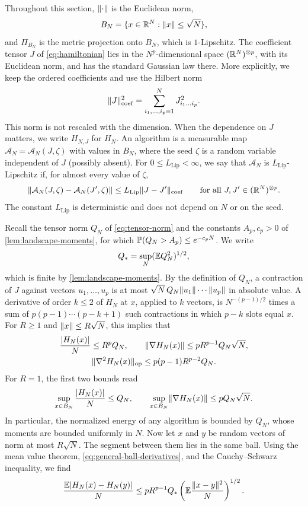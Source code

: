 Throughout this section, $\lVert\cdot\rVert$ is the Euclidean norm,
\[
 B_N=\{x\in\mathbb R^N:\lVert x\rVert\le\sqrt N\},
\]
and $\Pi_{B_N}$ is the metric projection onto $B_N$, which is $1$-Lipschitz.
The coefficient tensor $J$ of \eqref{eq:hamiltonian} lies in the
$N^p$-dimensional space $(\mathbb R^N)^{\otimes p}$, with its Euclidean norm, and
has the standard Gaussian law there. More explicitly, we keep the ordered
coefficients and use the Hilbert norm
\[
 \lVert J\rVert_{\mathrm{coef}}^2
 =\sum_{i_1,\dots,i_p=1}^N J_{i_1\dots i_p}^2 .
\]
This norm is not rescaled with the dimension. When the dependence on $J$ matters, we
write $H_{N,J}$ for $H_N$. An algorithm is a measurable map
$\mathcal A_N=\mathcal A_N(J,\zeta)$ with values in $B_N$, where the seed
$\zeta$ is a random variable independent of $J$ (possibly absent). For
$0\le L_{\mathrm{Lip}}<\infty$, we say that $\mathcal A_N$ is $L_{\mathrm{Lip}}$-Lipschitz if, for
almost every value of $\zeta$,
\[
 \lVert\mathcal A_N(J,\zeta)-\mathcal A_N(J',\zeta)\rVert\le L_{\mathrm{Lip}}\lVert J-J'\rVert_{\mathrm{coef}}
 \qquad\text{for all }J,J'\in(\mathbb R^N)^{\otimes p}.
\]
The constant $L_{\mathrm{Lip}}$ is deterministic and does not depend on $N$ or on the
seed.

Recall the tensor norm $Q_N$ of \eqref{eq:tensor-norm} and the constants
$A_p,c_p>0$ of \cref{lem:landscape-moments}, for which
$\mathbb P(Q_N>A_p)\le e^{-c_pN}$. We write
\[
 Q_*=\sup_N(\mathbb E Q_N^2)^{1/2},
\]
which is finite by \cref{lem:landscape-moments}. By the definition of
$Q_N$, a contraction of $J$ against vectors $u_1,\dots,u_p$ is at most
$\sqrt N\,Q_N\lVert u_1\rVert\cdots\lVert u_p\rVert$ in absolute value. A derivative of
order $k\le2$ of $H_N$ at $x$, applied to $k$ vectors, is
$N^{-(p-1)/2}$ times a sum of $p(p-1)\cdots(p-k+1)$ such contractions in
which $p-k$ slots equal $x$. For $R\ge1$ and $\lVert x\rVert\le R\sqrt N$, this
implies that
\begin{equation}\label{eq:general-ball-derivatives}
\begin{gathered}
 \frac{|H_N(x)|}N\le R^pQ_N,\qquad
 \lVert\nabla H_N(x)\rVert\le pR^{p-1}Q_N\sqrt N,\\
 \lVert\nabla^2H_N(x)\rVert_{\mathrm{op}}\le p(p-1)R^{p-2}Q_N.
\end{gathered}
\end{equation}
For $R=1$, the first two bounds read
\begin{equation}\label{sel:tensor-ui}
 \sup_{x\in B_N}\frac{|H_N(x)|}N\le Q_N,\qquad
 \sup_{x\in B_N}\lVert\nabla H_N(x)\rVert\le pQ_N\sqrt N.
\end{equation}
In particular, the normalized energy of any algorithm is bounded by $Q_N$,
whose moments are bounded uniformly in $N$. Now let $x$ and $y$ be random
vectors of norm at most $R\sqrt N$. The segment between them lies in the
same ball. Using the mean value theorem, \eqref{eq:general-ball-derivatives},
and the Cauchy--Schwarz inequality, we find
\begin{equation}\label{eq:general-energy-transfer}
 \frac{\mathbb E|H_N(x)-H_N(y)|}N
 \le pR^{p-1}Q_*\left(\mathbb E\frac{\lVert x-y\rVert^2}N\right)^{1/2}.
\end{equation}

